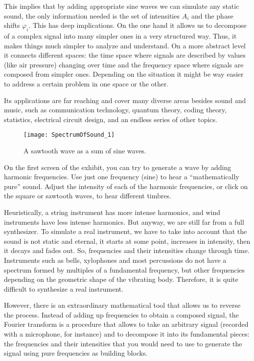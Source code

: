 This implies that by adding appropriate sine waves we can simulate any static sound, the only information needed is the set of intensities $A_i$ and the phase shifts $\varphi_i$. This has deep implications. On the one hand it allows us to decompose of a complex signal into many simpler ones in a very structured way. Thus, it makes things much simpler to analyze and understand. On a more abstract level it connects different spaces: the time space where signals are described by values (like air pressure) changing over time and the frequency space where signals are composed from simpler ones. Depending on the situation it might be way easier to address a certain problem in one space or the other.

Its applications are far reaching and cover many diverse areas besides sound and music, such as communication technology, quantum theory, coding theory, statistics, electrical circuit design, and an endless series of other topics.

\begin{wrapfigure}{l}{0.35\textwidth}
\centering
\texttt{[image: SpectrumOfSound\_1]}
\caption*{A sawtooth wave as a sum of sine waves.}
\end{wrapfigure}
On the first screen of the exhibit, you can try to generate a wave by adding harmonic frequencies. Use just one frequency (sine) to hear a ``mathematically pure'' sound. Adjust the intensity of each of the harmonic frequencies, or click on the square or sawtooth waves, to hear different timbres. 

Heuristically, a string instrument has more intense harmonics, and wind instruments have less intense harmonics. But anyway, we are still far from a full synthesizer. To simulate a real instrument, we have to take into account that the sound is not static and eternal, it starts at some point, increases in intensity, then it decays and fades out. So, frequencies and their intensities change through time. Instruments such as bells, xylophones and most percussions do not have a spectrum formed by multiples of a fundamental frequency, but other frequencies depending on the geometric shape of the vibrating body. Therefore, it is quite difficult to synthesize a real instrument.

However, there is an extraordinary mathematical tool that allows us to reverse the process. Instead of adding up frequencies to obtain a composed signal, the Fourier transform is a procedure that allows to take an arbitrary signal (recorded with a microphone, for instance) and to decompose it into its fundamental pieces: the frequencies and their intensities that you would need to use to generate the signal using pure frequencies as building blocks. 

